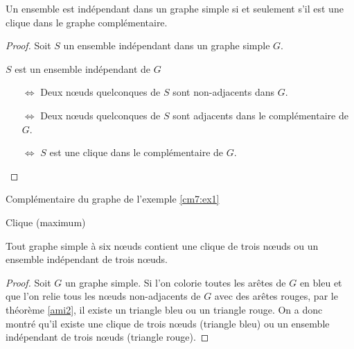 \begin{mytheo}
  Un ensemble est indépendant dans un graphe simple si et seulement s'il est une clique dans le graphe complémentaire.
  \begin{proof}
     Soit $S$ un ensemble indépendant dans un graphe simple $G$.

     $S$ est un ensemble indépendant de $G$
     \begin{itemize}
       \item[$\Leftrightarrow$] Deux nœuds quelconques de $S$ sont non-adjacents dans $G$.
       \item[$\Leftrightarrow$] Deux nœuds quelconques de $S$ sont adjacents dans le complémentaire de $G$.
       \item[$\Leftrightarrow$] $S$ est une clique dans le complémentaire de $G$.
     \end{itemize}
  \end{proof}
\end{mytheo}


\begin{myexem} Complémentaire du graphe de l'exemple \ref{cm7:ex1}
	\begin{figure} [!h]
	\centering
    \end{figure} \newline
    \color{red}Clique (maximum) \color{black}
\end{myexem}

\begin{mytheo} 
  Tout graphe simple à six nœuds contient une clique de trois nœuds ou un ensemble indépendant de trois nœuds.
  \begin{proof}
     Soit $G$ un graphe simple. Si l'on colorie toutes les arêtes de $G$ en bleu et que l'on relie tous les nœuds non-adjacents de $G$ avec des arêtes rouges, par le théorème \ref{ami2}, il existe un triangle bleu ou un triangle rouge.
     On a donc montré qu'il existe une clique de trois nœuds (triangle bleu) ou un ensemble indépendant de trois nœuds (triangle rouge).
  \end{proof}
\end{mytheo}


